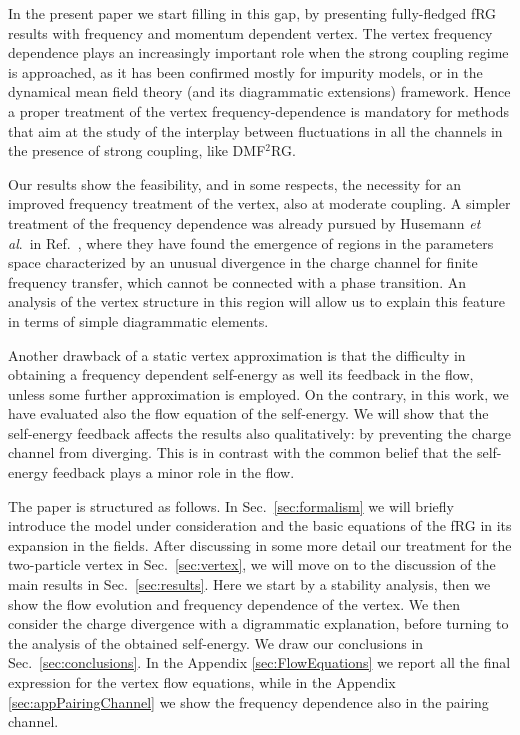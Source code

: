 In the present paper we start filling in this gap, by presenting fully-fledged fRG results with frequency and momentum dependent vertex.
The vertex frequency dependence plays an increasingly important role when the strong coupling regime is approached, as it has been confirmed mostly for impurity models,\cite{Kinza2013,Wentzell2016} or in the dynamical mean field theory\cite{Metzner1989,Georges1992,Georges1996} (and its diagrammatic extensions)\cite{Rohringer2017} framework.\cite{Rohringer2012}
Hence a proper treatment of the vertex frequency-dependence is mandatory for methods that aim at the study of the interplay between fluctuations in all the channels in the presence of strong coupling, like DMF$^2$RG.\cite{Taranto2014} 

Our results show the feasibility, and in some respects, the necessity for an improved frequency treatment of the vertex, also at moderate coupling.
A simpler treatment of the frequency dependence was already pursued by Husemann \emph{et al}.~in Ref.~, where they have found the emergence of regions in the parameters space characterized by an unusual divergence in the charge channel for finite frequency transfer, which cannot be connected with a phase transition.
 An analysis of the vertex structure in this region will allow us to explain this feature in terms of simple diagrammatic elements. 

Another drawback of a static vertex approximation is that the difficulty in obtaining a frequency dependent self-energy as well its feedback in the flow, unless some further approximation is employed.\cite{Honerkamp2001}
On the contrary, in this work, we have evaluated also the flow equation of the self-energy. 
We will show that the self-energy feedback  affects the results also qualitatively: by preventing the charge channel from diverging. 
This is in contrast with the common belief that the self-energy feedback plays a minor role in the flow.

The paper is structured as follows. In Sec.~\ref{sec:formalism} we will briefly introduce the model under consideration and the basic equations of the fRG in its expansion in the fields.
After discussing in some more detail our treatment for the two-particle vertex  in Sec.~\ref{sec:vertex}, we will move on to the discussion of the main results in Sec.~\ref{sec:results}. Here we start by a stability analysis, then we show the flow evolution and frequency dependence of the vertex. We then consider the charge divergence with a digrammatic explanation, before turning to the analysis of the obtained self-energy. We draw our conclusions in Sec.~\ref{sec:conclusions}. In the Appendix \ref{sec:FlowEquations} we report all the final expression for the vertex flow equations, while in the Appendix \ref{sec:appPairingChannel} we show the frequency dependence also in the pairing channel.

